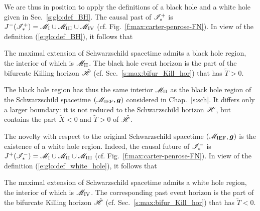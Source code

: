 We are thus in position to apply the definitions of a black hole and a white hole
given in Sec.~\ref{s:glo:def_BH}. The
causal past of $\mathscr{I}^+_*$ is $J^-(\mathscr{I}^+_*) = \mathscr{M}_{\rm I}\cup \mathscr{M}_{\rm III}\cup \mathscr{M}_{\rm IV}$
(cf. Fig.~\ref{f:max:carter-penrose-FN}). In view of the definition
(\ref{e:glo:def_BH}), it follows that
\begin{greybox}
The maximal extension of Schwarzschild spacetime admits a black hole region,
the interior of which is $\mathscr{M}_{\rm II}$. The black hole event horizon is the
part of the bifurcate Killing horizon $\hat{\mathscr{H}}$ (cf. Sec.~\ref{s:max:bifur_Kill_hor})
that has $\tilde{T}>0$.
\end{greybox}
The black hole region has thus the same interior $\mathscr{M}_{\rm II}$ as the black hole region
of the Schwarzschild spacetime $(\mathscr{M}_{\rm IEF}, \bm{g})$ considered in Chap.~\ref{s:sch}.
It differs only a larger boundary: it is not reduced to the Schwarzschild horizon $\mathscr{H}$,
but contains the part $\tilde{X}<0$ and $\tilde{T}>0$ of $\hat{\mathscr{H}}$.

The novelty with respect to the original Schwarzschild spacetime $(\mathscr{M}_{\rm IEF}, \bm{g})$
is the existence of a white hole region. Indeed, the causal future of $\mathscr{I}^-_*$ is
$J^+(\mathscr{I}^-_*) = \mathscr{M}_{\rm I}\cup \mathscr{M}_{\rm II}\cup \mathscr{M}_{\rm III}$
(cf. Fig.~\ref{f:max:carter-penrose-FN}). In view of the definition
(\ref{e:glo:def_white_hole}), it follows that
\begin{greybox}
The maximal extension of Schwarzschild spacetime admits a white hole region,
the interior of which is $\mathscr{M}_{\rm IV}$. The corresponding past event horizon is the
part of the bifurcate Killing horizon $\hat{\mathscr{H}}$ (cf. Sec.~\ref{s:max:bifur_Kill_hor})
that has $\tilde{T}<0$.
\end{greybox}


